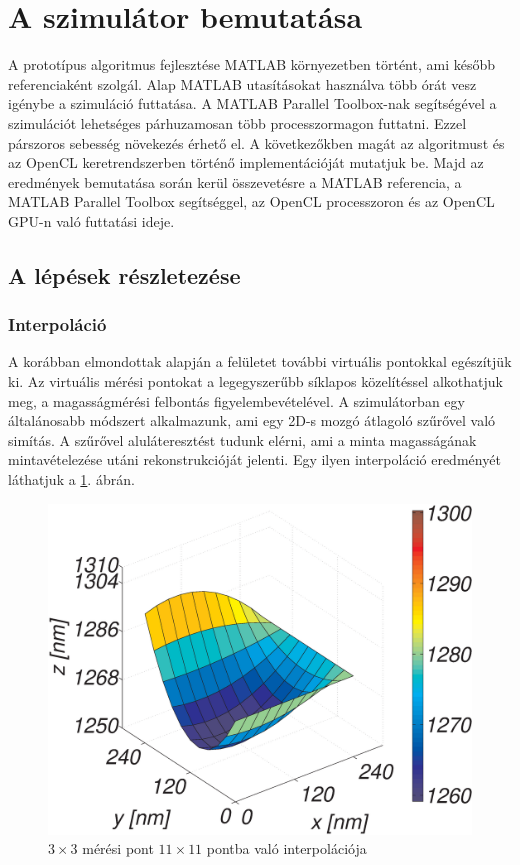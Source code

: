  \section{A szimulátor bemutatása} 
	 A prototípus algoritmus fejlesztése MATLAB környezetben történt, ami később
	 referenciaként szolgál.
	 Alap MATLAB utasításokat használva több órát vesz igénybe a szimuláció
	 futtatása.
	 A MATLAB Parallel Toolbox-nak segítségével a szimulációt lehetséges
	 párhuzamosan több processzormagon futtatni. Ezzel párszoros sebesség
	 növekezés érhető el.
	 A következőkben magát az algoritmust és az OpenCL keretrendszerben történő
	 implementációját mutatjuk be.
	 Majd az eredmények bemutatása során kerül összevetésre a MATLAB
	 referencia, a MATLAB Parallel Toolbox segítséggel, az OpenCL processzoron és
	 az OpenCL GPU-n való futtatási ideje.
	
\subsection{A lépések részletezése} 
\subsubsection{Interpoláció}
	A korábban elmondottak alapján a felületet további virtuális pontokkal egészítjük ki.
	Az virtuális mérési pontokat a legegyszerűbb síklapos közelítéssel alkothatjuk meg,
	a magasságmérési felbontás figyelembevételével.
	A szimulátorban egy általánosabb módszert alkalmazunk,
	ami egy 2D-s mozgó átlagoló szűrővel való simítás.
	A szűrővel aluláteresztést tudunk elérni, ami a minta magasságának
	mintavételezése utáni rekonstrukcióját jelenti. Egy ilyen interpoláció
	eredményét láthatjuk a \ref{fig:33pont}. ábrán.
	
	\begin{figure}[!h]
		\centering
		\includegraphics[width=0.8\columnwidth]{kepek/eps/3x3_interpol2.eps}
		\caption{\scriptsize $3\times3$ mérési pont $11\times11$ pontba való interpolációja}
		\label{fig:33pont}
	\end{figure}
	
